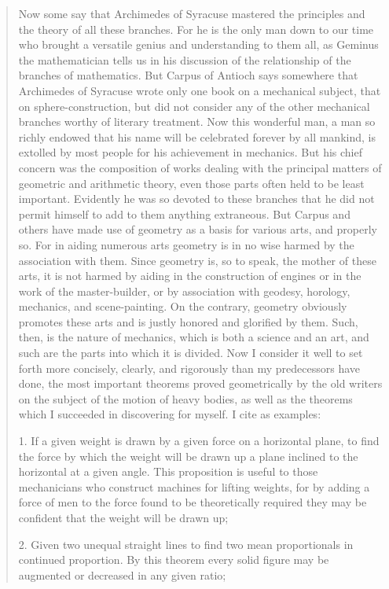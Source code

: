 \documentclass{article}
\begin{document}
\begin{quote}
Now some say that Archimedes of Syracuse mastered the principles
and the theory of all these branches. For he is the only man down to
our time who brought a versatile genius and understanding to them all,
as Geminus the mathematician tells us in his discussion of the relationship
of the branches of mathematics. But Carpus of Antioch says 
somewhere that Archimedes of Syracuse wrote only one book on a mechanical
subject, that on sphere-construction, but did not consider any of the other
mechanical branches worthy of literary treatment. Now this wonderful
man, a man so richly endowed that his name will be celebrated forever by
all mankind, is extolled by most people for his achievement in mechanics.
But his chief concern was the composition of works dealing with the 
principal matters of geometric and arithmetic theory, even those parts often
held to be least important. Evidently he was so devoted to these branches
that he did not permit himself to add to them anything extraneous.
But Carpus and others have made use of geometry as a basis for various
arts, and properly so. For in aiding numerous arts geometry is in no wise
harmed by the association with them. Since geometry is, so to speak, the
mother of these arts, it is not harmed by aiding in the construction of
engines or in the work of the master-builder, or by association with geodesy,
horology, mechanics, and scene-painting. On the contrary, geometry 
obviously promotes these arts and is justly honored and glorified by them.
Such, then, is the nature of mechanics, which is both a science and
an art, and such are the parts into which it is divided. Now I consider it
well to set forth more concisely, clearly, and rigorously than my 
predecessors have done, the most important theorems proved geometrically by the
old writers on the subject of the motion of heavy bodies, as well as the
theorems which I succeeded in discovering for myself. I cite as examples:

1. If a given weight is drawn by a given force on a horizontal plane, to
find the force by which the weight will be drawn up a plane inclined to the
horizontal at a given angle. This proposition is useful to those 
mechanicians who construct machines for lifting weights, for by adding a force of
men to the force found to be theoretically required they may be confident
that the weight will be drawn up;

2. Given two unequal straight lines to find two mean proportionals
in continued proportion. By this theorem every solid figure may be
augmented or decreased in any given ratio;


\end{quote}
\end{document}
